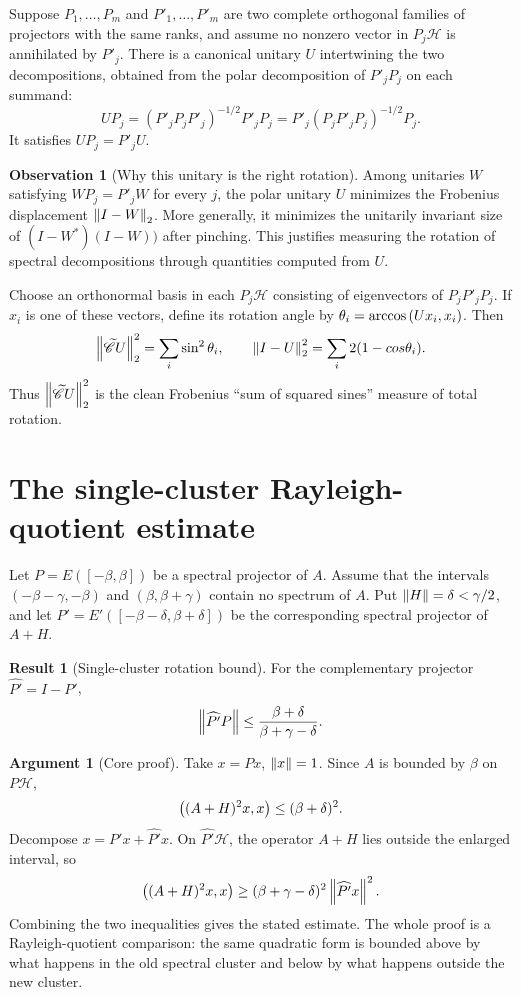 \documentclass[11pt]{article}
\newcommand{\Hsp}{\mathscr{H}}
\newcommand{\Off}{\widetilde{\mathscr{C}}}
\newcommand{\Hsp}{\mathcal{H}}
\newcommand{\Off}{\mathcal{D}^{\perp}}
\newcommand{\Id}{I}
\newcommand{\Pphat}{\widehat{P'}}
\theoremstyle{definition}
\newtheorem{observation}[definition]{Observation}
\newtheorem{result}[definition]{Result}
\newtheorem{argument}[definition]{Argument}
\begin{document}
Suppose \(P_1,\ldots,P_m\) and \(P'_1,\ldots,P'_m\) are two complete orthogonal
families of projectors with the same ranks, and assume no nonzero vector in
\(P_j\Hsp\) is annihilated by \(P'_j\).  There is a canonical unitary \(U\)
intertwining the two decompositions, obtained from the polar decomposition of
\(P'_jP_j\) on each summand:
\[
  U P_j
  = (P'_jP_jP'_j)^{-1/2} P'_jP_j
  = P'_j(P_jP'_jP_j)^{-1/2}P_j .
\]
It satisfies \(UP_j=P'_jU\).

\begin{observation}[Why this unitary is the right rotation]
Among unitaries \(W\) satisfying \(WP_j=P'_jW\) for every \(j\), the polar
unitary \(U\) minimizes the Frobenius displacement \(\norm[2]{\Id-W}\).  More
generally, it minimizes the unitarily invariant size of
\((\Id-W^*)(\Id-W))\) after pinching.  This justifies measuring the rotation of
spectral decompositions through quantities computed from \(U\).
\end{observation}

Choose an orthonormal basis in each \(P_j\Hsp\) consisting of eigenvectors of
\(P_jP'_jP_j\).  If \(x_i\) is one of these vectors, define its rotation angle by
\(\theta_i=\arccos\left(Ux_i,x_i\right)\).  Then
\[
  \norm[2]{\Off U}^2 = \sum_i \sin^2\theta_i,
  \qquad
  \norm[2]{\Id-U}^2 = \sum_i 2(1-\\cos\theta_i).
\]
Thus \(\norm[2]{\Off U}^2\) is the clean Frobenius ``sum of squared sines''
measure of total rotation.

\section{The single-cluster Rayleigh-quotient estimate}

Let \(P=E([-\beta,\beta])\) be a spectral projector of \(A\).  Assume that the
intervals \((-\beta-\gamma,-\beta)\) and \((\beta,\beta+\gamma)\) contain no
spectrum of \(A\).  Put \(\norm{H}=\delta<\gamma/2\), and let
\(P'=E'([-\beta-\delta,\beta+\delta])\) be the corresponding spectral projector
of \(A+H\).

\begin{result}[Single-cluster rotation bound]
For the complementary projector \(\Pphat=\Id-P'\),
\[
  \norm{\Pphat P} \le
  \frac{\beta+\delta}{\beta+\gamma-\delta}.
\]
\end{result}

\begin{argument}[Core proof]
Take \(x=Px\), \(\norm{x}=1\).  Since \(A\) is bounded by \(\beta\) on
\(P\Hsp\),
\[
  \left((A+H)^2x,x\right)\le (\beta+\delta)^2.
\]
Decompose \(x=P'x+\Pphat x\).  On \(\Pphat\Hsp\), the operator \(A+H\) lies
outside the enlarged interval, so
\[
  \inner{(A+H)^2x}{x}\ge (\beta+\gamma-\delta)^2\norm{\Pphat x}^2.
\]
Combining the two inequalities gives the stated estimate.  The whole proof is
a Rayleigh-quotient comparison: the same quadratic form is bounded above by
what happens in the old spectral cluster and below by what happens outside the
new cluster.
\end{argument}
\end{document}

